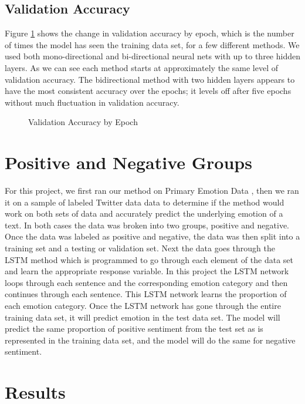 \documentclass[titlepage,letterpaper]{article}
\begin{document}
\subsection{Validation Accuracy}
Figure \ref{valepoch} shows the change in validation accuracy by epoch, which is the number of times the model has seen the training data set, for a few different methods. We used both mono-directional and bi-directional neural nets with up to three hidden layers. As we can see each method starts at approximately the same level of validation accuracy. The bidirectional method with two hidden layers appears to have the most consistent accuracy over the epochs; it levels off after five epochs without much fluctuation in validation accuracy. 

\begin{figure}[htb]
	\centering
	\caption{Validation Accuracy by Epoch}
	\resizebox{4in}{!}{}
	\label{valepoch}
\end{figure}
\section{Positive and Negative Groups}

For this project, we first ran our method on Primary Emotion Data \cite{lowriwilliams}, then we ran it on a sample of labeled Twitter data \cite{LabeledTwitter} data to determine if the method would work on both sets of data and accurately predict the underlying emotion of a text. In both cases the data was broken into two groups, positive and negative. Once the data was labeled as positive and negative, the data was then split into a training set and a testing or validation set. Next the data goes through the LSTM method which is programmed to go through each element of the data set and learn the appropriate response variable. In this project the LSTM network loops through each sentence and the corresponding emotion category and then continues through each sentence. This LSTM network learns the proportion of each emotion category. Once the LSTM network has gone through the entire training data set, it will predict emotion in the test data set. The model will predict the same proportion of positive sentiment from the test set as is represented in the training data set, and the model will do the same for negative sentiment. 

\section{Results}
\end{document}
